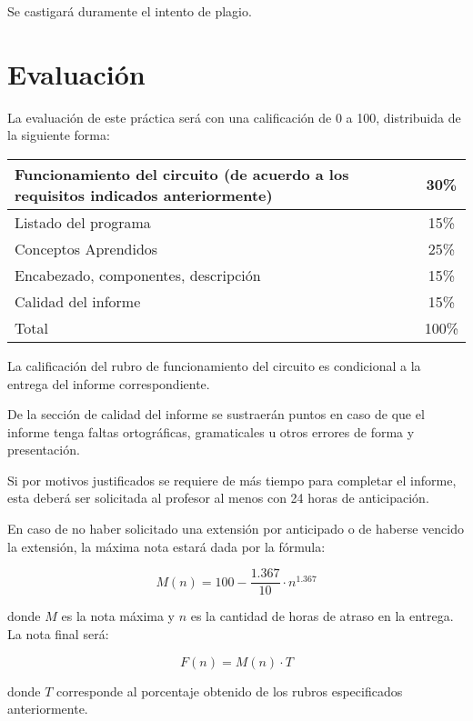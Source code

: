 \documentclass[12pt,letterpaper]{IEEEtran}
\begin{document}
Se castigará duramente el intento de plagio.

\section{Evaluación}

La evaluación de este práctica será con una calificación de 0 a 100, distribuida de la siguiente forma:

\begin{center}
 \begin{tabular}{p{}|c}\hline
   Funcionamiento del circuito (de acuerdo a los requisitos indicados anteriormente) 					     & 30\% \\\hline
   Listado del programa					& 15\% \\\hline
   Conceptos Aprendidos					& 25\% \\\hline
   Encabezado, componentes, descripción & 15\% \\\hline
   Calidad del informe					& 15\% \\\hline\hline
   Total								& 100\% \\
 \end{tabular}
\end{center}

La calificación del rubro de funcionamiento del circuito es condicional a la entrega del informe correspondiente.

De la sección de calidad del informe se sustraerán puntos en caso de que el informe tenga faltas ortográficas, gramaticales u otros errores de forma y presentación.

Si por motivos justificados se requiere de más tiempo para completar el informe, esta deberá ser solicitada al profesor al menos con 24 horas de anticipación.

En caso de no haber solicitado una extensión por anticipado o de haberse vencido la extensión, la máxima nota estará dada por la fórmula:

\[ M(n) = 100-\frac{1.367}{10}\cdot n^{1.367} \]

donde $M$ es la nota máxima y $n$ es la cantidad de horas de atraso en la entrega. La nota final será:

\[ F(n) = M(n)\cdot T \]

donde $T$ corresponde al porcentaje obtenido de los rubros especificados anteriormente.
\end{document}
